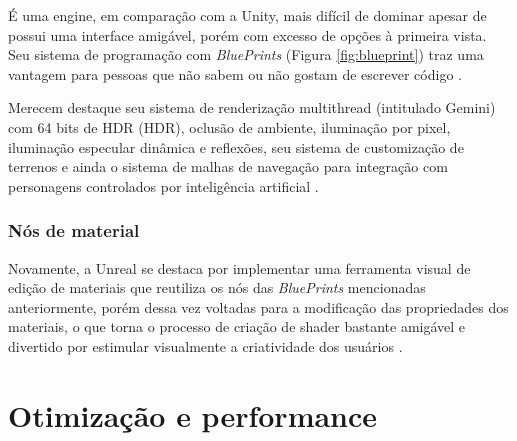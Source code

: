 É uma engine, em comparação com a Unity, mais difícil de dominar apesar de possui uma interface amigável, porém com excesso de opções à primeira vista. Seu sistema de programação com \textit{BluePrints} (Figura \ref{fig:blueprint}) traz uma vantagem para pessoas que não sabem ou não gostam de escrever código \cite{compStudyGE}.

Merecem destaque seu sistema de renderização \Gls{multithread} (intitulado Gemini) com 64 bits de HDR (\acrlong{HDR}), oclusão de ambiente, iluminação por pixel, iluminação especular dinâmica e reflexões, seu sistema de customização de terrenos e ainda o sistema de malhas de navegação para integração com personagens controlados por inteligência artificial \cite{armstrong2013game}.
 
\subsubsection{Nós de material}
\label{sec:material-nodes}

Novamente, a Unreal se destaca por implementar uma ferramenta visual de edição de materiais que reutiliza os nós das \textit{BluePrints} mencionadas anteriormente, porém dessa vez voltadas para a modificação das propriedades dos materiais, o que torna o processo de criação de shader bastante amigável e divertido por estimular visualmente a criatividade dos usuários \cite{compStudyGE}. 

\begin{figure}[h!]
	\centering
\end{figure}
\nocite{materialUnreal}

\section{Otimização e performance}
\label{sec:otimizacao-performance}

